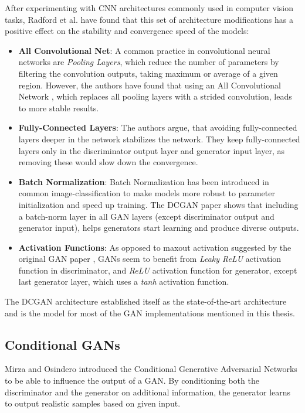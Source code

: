 \documentclass[12pt]{report}
\begin{document}
After experimenting with CNN architectures commonly used in computer vision tasks, Radford et al. \cite{radford_unsupervised_2015} have found that this set of architecture modifications has a positive effect on the stability and convergence speed of the models:
\begin{itemize}
\item \textbf{All Convolutional Net}: A common practice in convolutional neural networks are \textit{Pooling Layers}, which reduce the number of parameters by filtering the convolution outputs, taking maximum or average of a given region. However, the authors have found that using an All Convolutional Network \cite{springenberg_striving_2014}, which replaces all pooling layers with a strided convolution, leads to more stable results.
\item \textbf{Fully-Connected Layers}: The authors argue, that avoiding fully-connected layers deeper in the network stabilizes the network. They keep fully-connected layers only in the discriminator output layer and generator input layer, as removing these would slow down the convergence.
\item \textbf{Batch Normalization}: Batch Normalization \cite{ioffe_batch_2015} has been introduced in common image-classification to make models more robust to parameter initialization and speed up training. The DCGAN paper shows that including a batch-norm layer in all GAN layers (except discriminator output and generator input), helps generators start learning and produce diverse outputs.
\item \textbf{Activation Functions}: As opposed to maxout activation suggested by the original GAN paper \cite{goodfellow_generative_2014}, GANs seem to benefit from \textit{Leaky ReLU} activation function in discriminator, and \textit{ReLU} activation function for generator, except last generator layer, which uses a \textit{tanh} activation function.
\end{itemize}

The DCGAN architecture established itself as the state-of-the-art architecture and is the model for most of the GAN implementations mentioned in this thesis.

\subsection{Conditional GANs} \label{sec:cond_gan}
Mirza and Osindero \cite{mirza_conditional_2014} introduced the Conditional Generative Adversarial Networks to be able to influence the output of a GAN. By conditioning both the discriminator and the generator on additional information, the generator learns to output realistic samples based on given input.
\end{document}
